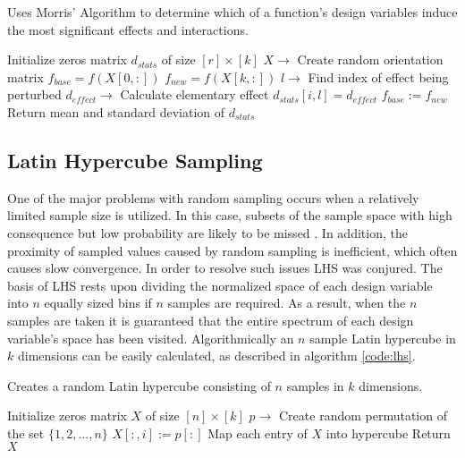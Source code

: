 \begin{algorithm}
\caption{\label{code:morris_algorithm} 
Uses Morris' Algorithm to determine which of a function's design variables induce the most significant effects and interactions.} 
\begin{algorithmic}[1]
\State Initialize zeros matrix $d_{stats}$ of size $[r]\times[k]$
   \State $X\rightarrow$ Create random orientation matrix 
   \State $f_{base} = f(X[0,:])$
      \State $f_{new} = f(X[k,:])$
      \State $l\rightarrow$ Find index of effect being perturbed
      \State $d_{effect}\rightarrow$ Calculate elementary effect  
      \State $d_{stats}[i,l] = d_{effect}$
      \State $f_{base} := f_{new}$
   \EndFor
\EndFor
\State Return mean and standard deviation of $d_{stats}$ 
\end{algorithmic}
\end{algorithm}

\subsection{Latin Hypercube Sampling}
\label{subsec:lhs}

One of the major problems with random sampling occurs when a relatively limited sample size is utilized. In this case, subsets of the sample space with high consequence but low probability are likely to be missed \cite{Helton}. In addition, the proximity of sampled values caused by random sampling is inefficient, which often causes slow convergence. In order to resolve such issues \ac{LHS} was conjured. The basis of \ac{LHS} rests upon dividing the normalized space of each design variable into $n$ equally sized bins if $n$ samples are required. As a result, when the $n$ samples are taken it is guaranteed that the entire spectrum of each design variable's space has been visited. Algorithmically an $n$ sample Latin hypercube in $k$ dimensions can be easily calculated, as described in algorithm \ref{code:lhs}.

\begin{algorithm}
\caption{\label{code:lhs} 
Creates a random Latin hypercube consisting of $n$ samples in $k$ dimensions.} 
\begin{algorithmic}[1]
\State Initialize zeros matrix $X$ of size $[n]\times[k]$
   \State $p\rightarrow$ Create random permutation of the set $\lbrace 1,2,...,n\rbrace$ 
   \State $X[:,i] := p[:]$
\EndFor
\State Map each entry of $X$ into hypercube
\State Return $X$ 
\end{algorithmic}
\end{algorithm}


